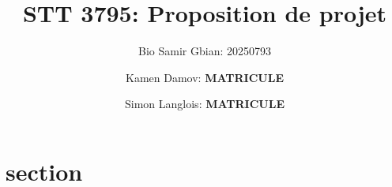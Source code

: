 \documentclass{article}
\title{STT 3795: Proposition de projet}
\author{Bio Samir Gbian: 20250793}
\author{Kamen Damov: \textbf{MATRICULE}}
\author{Simon Langlois: \textbf{MATRICULE}}
\affil{Département de mathématiques et statistiques}
\affil{Université de Montréal}
\begin{document}
\maketitle

\section{section}
\end{document}
